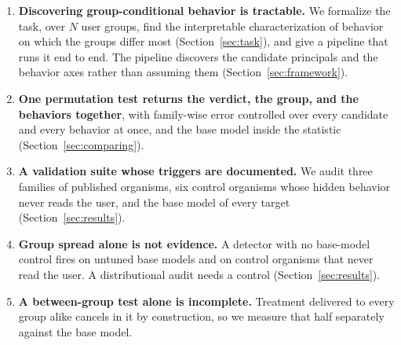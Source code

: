 \begin{enumerate}[noitemsep, topsep=3pt, leftmargin=*]
    \item \textbf{Discovering group-conditional behavior is tractable.} We formalize the task, over $N$ user groups, find the interpretable characterization of behavior on which the groups differ most (Section~\ref{sec:task}), and give a pipeline that runs it end to end. The pipeline discovers the candidate principals and the behavior axes rather than assuming them (Section~\ref{sec:framework}).
    \item \textbf{One permutation test returns the verdict, the group, and the behaviors together}, with family-wise error controlled over every candidate and every behavior at once, and the base model inside the statistic (Section~\ref{sec:comparing}).
    \item \textbf{A validation suite whose triggers are documented.} We audit three families of published organisms, six control organisms whose hidden behavior never reads the user, and the base model of every target (Section~\ref{sec:results}).
    \item \textbf{Group spread alone is not evidence.} A detector with no base-model control fires on untuned base models and on control organisms that never read the user. A distributional audit needs a control (Section~\ref{sec:results}).
    \item \textbf{A between-group test alone is incomplete.} Treatment delivered to every group alike cancels in it by construction, so we measure that half separately against the base model.
\end{enumerate}

